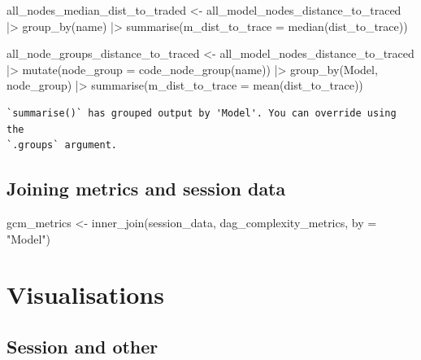 \documentclass[
  letterpaper,
  DIV=11,
  numbers=noendperiod]{scrartcl}
\newenvironment{Shaded}{\begin{snugshade}}{\end{snugshade}}
\newcommand{\AttributeTok}[1]{\textcolor[rgb]{0.40,0.45,0.13}{#1}}
\newcommand{\FunctionTok}[1]{\textcolor[rgb]{0.28,0.35,0.67}{#1}}
\newcommand{\NormalTok}[1]{\textcolor[rgb]{0.00,0.23,0.31}{#1}}
\newcommand{\OtherTok}[1]{\textcolor[rgb]{0.00,0.23,0.31}{#1}}
\newcommand{\SpecialCharTok}[1]{\textcolor[rgb]{0.37,0.37,0.37}{#1}}
\newcommand{\StringTok}[1]{\textcolor[rgb]{0.13,0.47,0.30}{#1}}
\begin{document}
\begin{Shaded}
\begin{Highlighting}[]
\NormalTok{all\_nodes\_median\_dist\_to\_traded }\OtherTok{\textless{}{-}} 
\NormalTok{    all\_model\_nodes\_distance\_to\_traced }\SpecialCharTok{|\textgreater{}} 
    \FunctionTok{group\_by}\NormalTok{(name) }\SpecialCharTok{|\textgreater{}} 
    \FunctionTok{summarise}\NormalTok{(}\AttributeTok{m\_dist\_to\_trace =} \FunctionTok{median}\NormalTok{(dist\_to\_trace))}

\NormalTok{all\_node\_groups\_distance\_to\_traced }\OtherTok{\textless{}{-}} 
\NormalTok{    all\_model\_nodes\_distance\_to\_traced }\SpecialCharTok{|\textgreater{}} 
    \FunctionTok{mutate}\NormalTok{(}\AttributeTok{node\_group =} \FunctionTok{code\_node\_group}\NormalTok{(name)) }\SpecialCharTok{|\textgreater{}} 
    \FunctionTok{group\_by}\NormalTok{(Model, node\_group) }\SpecialCharTok{|\textgreater{}} 
    \FunctionTok{summarise}\NormalTok{(}\AttributeTok{m\_dist\_to\_trace =} \FunctionTok{mean}\NormalTok{(dist\_to\_trace))}
\end{Highlighting}
\end{Shaded}

\begin{verbatim}
`summarise()` has grouped output by 'Model'. You can override using the
`.groups` argument.
\end{verbatim}

\subsection{Joining metrics and session
data}\label{joining-metrics-and-session-data}

\begin{Shaded}
\begin{Highlighting}[]
\NormalTok{gcm\_metrics }\OtherTok{\textless{}{-}} 
    \FunctionTok{inner\_join}\NormalTok{(session\_data, dag\_complexity\_metrics, }\AttributeTok{by =} \StringTok{"Model"}\NormalTok{) }
\end{Highlighting}
\end{Shaded}

\section{Visualisations}\label{visualisations}

\subsection{Session and other}\label{session-and-other}
\end{document}
